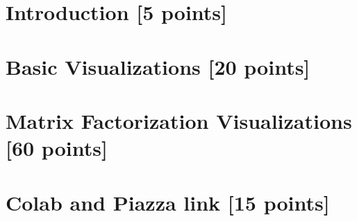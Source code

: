 \newif\ifshowsolutions
\showsolutionstrue







\pagestyle{fancy}


\newpage

\section{Introduction [5 points]}
\newpage

\section{Basic Visualizations [20 points]}
\newpage

\section{Matrix Factorization Visualizations [60 points]}
\newpage

\section{Colab and Piazza link [15 points]}
\newpage


